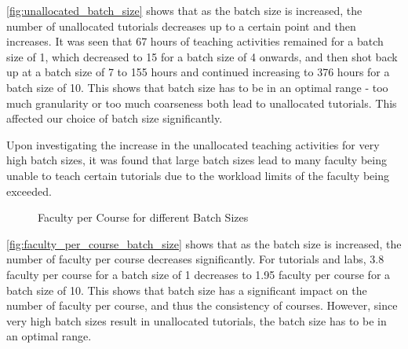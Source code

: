 \autoref{fig:unallocated_batch_size} shows that as the batch size is increased, the number of unallocated tutorials decreases up to a certain point and then increases. It was seen that  67 hours of teaching activities remained for a batch size of 1, which decreased to 15 for a batch size of 4 onwards, and then shot back up at a batch size of 7 to 155 hours and continued increasing to 376 hours for a batch size of 10. This shows that batch size has to be in an optimal range - too much granularity or too much coarseness both lead to unallocated tutorials. This affected our choice of batch size significantly.

Upon investigating the increase in the unallocated teaching activities for very high batch sizes, it was found that large batch sizes lead to many faculty being unable to teach certain tutorials due to the workload limits of the faculty being exceeded.

\begin{figure}[H]
  \centering
  \caption{Faculty per Course for different Batch Sizes}
  \label{fig:faculty_per_course_batch_size}
\end{figure}

\autoref{fig:faculty_per_course_batch_size} shows that as the batch size is increased, the number of faculty per course decreases significantly. For tutorials and labs, 3.8 faculty per course for a batch size of 1 decreases to 1.95 faculty per course for a batch size of 10. This shows that batch size has a significant impact on the number of faculty per course, and thus the consistency of courses. However, since very high batch sizes result in unallocated tutorials, the batch size has to be in an optimal range.


